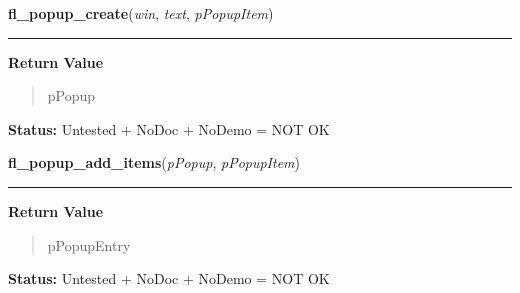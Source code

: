     \vspace{0.5ex}

\hspace{.8\funcindent}\begin{boxedminipage}{\funcwidth}

    \raggedright \textbf{fl\_popup\_create}(\textit{win}, \textit{text}, \textit{pPopupItem})

    \vspace{-1.5ex}

    \rule{\textwidth}{0.5\fboxrule}
\setlength{\parskip}{2ex}
\setlength{\parskip}{1ex}
      \textbf{Return Value}
    \vspace{-1ex}

      \begin{quote}
      pPopup

      \end{quote}

\textbf{Status:} Untested + NoDoc + NoDemo = NOT OK



    \end{boxedminipage}

    \label{xformslib:flpopup:fl_popup_add_items}

    \vspace{0.5ex}

\hspace{.8\funcindent}\begin{boxedminipage}{\funcwidth}

    \raggedright \textbf{fl\_popup\_add\_items}(\textit{pPopup}, \textit{pPopupItem})

    \vspace{-1.5ex}

    \rule{\textwidth}{0.5\fboxrule}
\setlength{\parskip}{2ex}
\setlength{\parskip}{1ex}
      \textbf{Return Value}
    \vspace{-1ex}

      \begin{quote}
      pPopupEntry

      \end{quote}

\textbf{Status:} Untested + NoDoc + NoDemo = NOT OK



    \end{boxedminipage}

    \label{xformslib:flpopup:fl_popup_insert_items}

